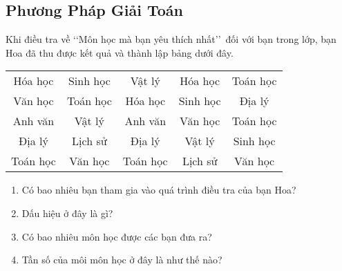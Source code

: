 \subsection{Phương Pháp Giải Toán}
\begin{vd}%
	Khi điều tra về \lq \lq Môn học mà bạn yêu thích nhất\rq \rq \, đối với bạn trong lớp, bạn Hoa đã thu được kết quả và thành lập bảng dưới đây.
		\begin{center}
			\begin{tabular}{|c|c|c|c|c|}
				\hline 
				Hóa học & Sinh học & Vật lý & Hóa học & Toán học\\ 
				Văn học & Toán học & Hóa học & Sinh học & Địa lý\\ 
				Anh văn & Vật lý & Anh văn & Văn học & Toán học \\
				Địa lý & Lịch sử & Địa lý & Vật lý & Sinh học \\
				Toán học & Văn học & Toán học & Lịch sử & Văn học \\
				\hline 
			\end{tabular}
		\end{center}
	\begin{enumerate}
		\item Có bao nhiêu bạn tham gia vào quá trình điều tra của bạn Hoa?
		\item Dấu hiệu ở đây là gì?
		\item Có bao nhiêu môn học được các bạn đưa ra?
		\item Tần số của môi môn học ở đây là như thế nào?
	\end{enumerate}
\end{vd}
